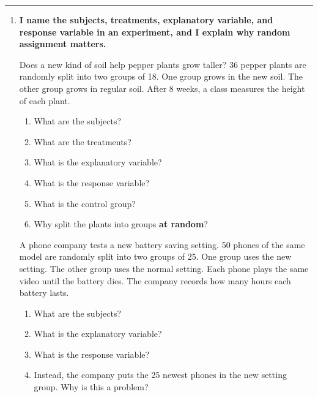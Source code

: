 \documentclass[11pt]{article}
\newcommand{\lessonhead}[1]{\par\vspace{0.6em}{\large\bfseries #1}\par\vspace{0.25em}\hrule\vspace{0.6em}}
\newcommand{\goal}[1]{\textbf{#1}\par\vspace{0.35em}}
\begin{document}
\newpage
\lessonhead{5.3 - Experiments}
\begin{enumerate}[resume]

\item \goal{I name the subjects, treatments, explanatory variable, and response variable in an experiment, and I explain why random assignment matters.}
Does a new kind of soil help pepper plants grow taller? 36 pepper plants are randomly split into two groups of 18. One group grows in the new soil. The other group grows in regular soil. After 8 weeks, a class measures the height of each plant.
\begin{enumerate}[itemsep=1.5em]
  \item What are the subjects? 
  \item What are the treatments? 
  \item What is the explanatory variable? 
  \item What is the response variable? 
  \item What is the control group? 
  \item Why split the plants into groups \textbf{at random}?

  \work{4em}
\end{enumerate}

\vspace{0.6em}
A phone company tests a new battery saving setting. 50 phones of the same model are randomly split into two groups of 25. One group uses the new setting. The other group uses the normal setting. Each phone plays the same video until the battery dies. The company records how many hours each battery lasts.
\begin{enumerate}[start=7,itemsep=1.5em]
  \item What are the subjects? 
  \item What is the explanatory variable? 
  \item What is the response variable? 
  \item Instead, the company puts the 25 newest phones in the new setting group. Why is this a problem?


\end{enumerate}
\end{enumerate}
\end{document}
